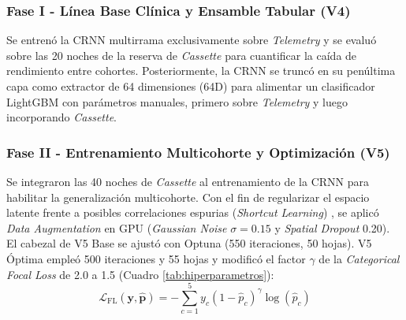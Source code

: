 \documentclass[conference]{IEEEtran}
\begin{document}
\subsubsection{Fase I - Línea Base Clínica y Ensamble Tabular (V4)}
Se entrenó la CRNN multirrama exclusivamente sobre \textit{Telemetry} y se evaluó sobre las 20 noches de la reserva de \textit{Cassette} para cuantificar la caída de rendimiento entre cohortes. Posteriormente, la CRNN se truncó en su penúltima capa como extractor de 64 dimensiones (64D) para alimentar un clasificador LightGBM \cite{ke2017} con parámetros manuales, primero sobre \textit{Telemetry} y luego incorporando \textit{Cassette}.

\subsubsection{Fase II - Entrenamiento Multicohorte y Optimización (V5)}
Se integraron las 40 noches de \textit{Cassette} al entrenamiento de la CRNN para habilitar la generalización multicohorte. Con el fin de regularizar el espacio latente frente a posibles correlaciones espurias (\textit{Shortcut Learning}) \cite{geirhos2020shortcut}, se aplicó \textit{Data Augmentation} en GPU (\textit{Gaussian Noise} $\sigma=0.15$ y \textit{Spatial Dropout} 0.20). El cabezal de V5 Base se ajustó con Optuna \cite{akiba2019optuna} (550 iteraciones, 50 hojas). V5 Óptima empleó 500 iteraciones y 55 hojas y modificó el factor $\gamma$ de la \textit{Categorical Focal Loss} \cite{lin2017} de 2.0 a 1.5 (Cuadro \ref{tab:hiperparametros}):
\begin{equation}
\mathcal{L}_{\text{FL}}(\mathbf{y}, \hat{\mathbf{p}}) = -\sum_{c=1}^{5} y_c (1 - \hat{p}_c)^{\gamma} \log(\hat{p}_c)
\label{eq:focal_loss}
\end{equation}

\begin{table}[htbp]
\centering
\caption{Resumen de Cambios en el Entrenamiento de la CRNN (246,053 Parámetros, LR Guardada=0.000125, Latente=64D, Dropout Max=0.4)}
\label{tab:hiperparametros}
\end{table}
\end{document}
